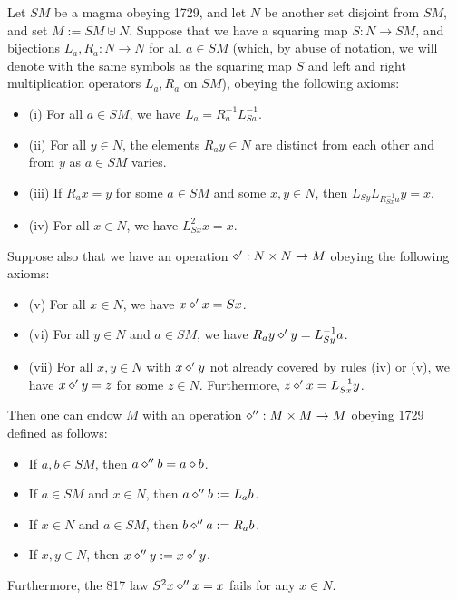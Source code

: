 \begin{theorem}\label{mag}  Let $SM$ be a magma obeying 1729, and let $N$ be another set disjoint from $SM$, and set $M := SM \uplus N$.  Suppose that we have a squaring map $S: N \to SM$, and bijections $L_a, R_a: N \to N$ for all $a \in SM$ (which, by abuse of notation, we will denote with the same symbols as the squaring map $S$ and left and right multiplication operators $L_a,R_a$ on $SM$), obeying the following axioms:
  \begin{itemize}
  \item (i) For all $a \in SM$, we have $L_a = R_a^{-1} L_{Sa}^{-1}$.
  \item (ii) For all $y \in N$, the elements $R_a y \in N$ are distinct from each other and from $y$ as $a \in SM$ varies.
  \item (iii)  If $R_a x = y$ for some $a \in SM$ and some $x,y \in N$, then $L_{Sy} L_{R_{Sx}^{-1} a} y = x$.
  \item (iv)  For all $x \in N$, we have $L_{Sx}^2 x = x$.
  \end{itemize}
Suppose also that we have an operation $\diamond': N \times N \to M$ obeying the following axioms:
\begin{itemize}
  \item (v)  For all $x \in N$, we have $x \diamond' x = Sx$.
  \item (vi)  For all $y \in N$ and $a \in SM$, we have $R_a y \diamond' y = L_{Sy}^{-1} a$.
  \item (vii)  For all $x,y \in N$ with $x \diamond' y$ not already covered by rules (iv) or (v), we have $x \diamond' y = z$ for some $z \in N$.  Furthermore, $z \diamond' x = L_{Sx}^{-1} y$.
\end{itemize}
Then one can endow $M$ with an operation $\diamond'': M \times M \to M$ obeying 1729 defined as follows:
\begin{itemize}
\item  If $a,b \in SM$, then $a \diamond'' b = a \diamond b$.
\item  If $a \in SM$ and $x \in N$, then $a \diamond'' b := L_a b$.
\item  If $x \in N$ and $a \in SM$, then $b \diamond'' a := R_a b$.
\item  If $x,y \in N$, then $x \diamond'' y := x \diamond' y$.
\end{itemize}
Furthermore, the 817 law $S^2 x \diamond'' x = x$ fails for any $x \in N$.
\end{theorem}

